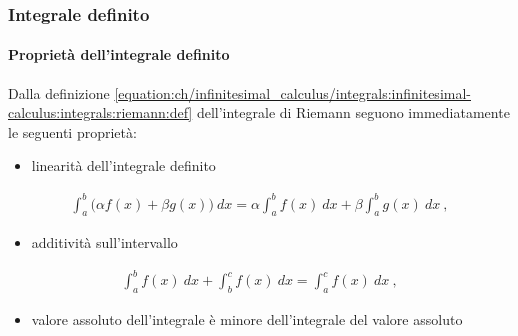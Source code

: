 \documentclass[letterpaper,10pt,english]{jupyterBook}
\begin{document}
\subsubsection{Integrale definito}
\label{\detokenize{ch/infinitesimal_calculus/integrals:integrale-definito}}\label{\detokenize{ch/infinitesimal_calculus/integrals:infinitesimal-calculus-integrals-def-definite}}

\paragraph{Proprietà dell’integrale definito}
\label{\detokenize{ch/infinitesimal_calculus/integrals:proprieta-dell-integrale-definito}}\label{\detokenize{ch/infinitesimal_calculus/integrals:infinitesimal-calculus-integrals-def-definite-prop}}\label{\detokenize{ch/infinitesimal_calculus/integrals:infinitesimal-calculus-integrals-def-indefinite}}
\sphinxAtStartPar
Dalla definizione \eqref{equation:ch/infinitesimal_calculus/integrals:infinitesimal-calculus:integrals:riemann:def} dell’integrale di Riemann seguono immediatamente le seguenti proprietà:
\begin{itemize}
\item {} 
\sphinxAtStartPar
linearità dell’integrale definito

\end{itemize}
\begin{equation}\label{equation:ch/infinitesimal_calculus/integrals:infinitesimal-calculus:integrals:prop:linearity}
\begin{split}\int_a^b \big( \alpha f(x) + \beta g(x) \big) \ dx = \alpha \int_a^b f(x) \ dx + \beta \int_a^b g(x) \ dx \ ,\end{split}
\end{equation}\begin{itemize}
\item {} 
\sphinxAtStartPar
additività sull’intervallo

\end{itemize}
\begin{equation}\label{equation:ch/infinitesimal_calculus/integrals:infinitesimal-calculus:integrals:prop:add}
\begin{split}\int_a^b f(x) \ dx + \int_b^c f(x) \ dx = \int_a^c f(x) \ dx \ ,\end{split}
\end{equation}\begin{itemize}
\item {} 
\sphinxAtStartPar
valore assoluto dell’integrale è minore dell’integrale del valore assoluto

\end{itemize}
\end{document}
